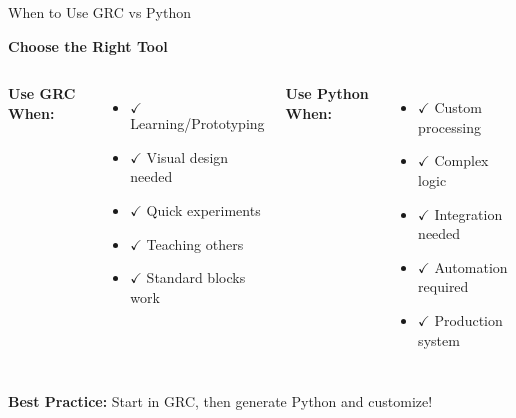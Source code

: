 \documentclass[aspectratio=169,11pt]{beamer}
\begin{document}
\begin{frame}{When to Use GRC vs Python}
\begin{center}
\Large\textbf{Choose the Right Tool}
\end{center}
\vspace{1em}
\begin{columns}
\textbf{Use GRC When:}
\begin{itemize}
    \item \textcolor{radiogreen}{$\checkmark$} Learning/Prototyping
    \item \textcolor{radiogreen}{$\checkmark$} Visual design needed
    \item \textcolor{radiogreen}{$\checkmark$} Quick experiments
    \item \textcolor{radiogreen}{$\checkmark$} Teaching others
    \item \textcolor{radiogreen}{$\checkmark$} Standard blocks work
\end{itemize}

\textbf{Use Python When:}
\begin{itemize}
    \item \textcolor{radioblue}{$\checkmark$} Custom processing
    \item \textcolor{radioblue}{$\checkmark$} Complex logic
    \item \textcolor{radioblue}{$\checkmark$} Integration needed
    \item \textcolor{radioblue}{$\checkmark$} Automation required
    \item \textcolor{radioblue}{$\checkmark$} Production system
\end{itemize}
\end{columns}
\vspace{1em}
\begin{center}\colorbox{yellow!20}{\parbox{0.9\textwidth}{
\textbf{Best Practice:} Start in GRC, then generate Python and customize!
}}\end{center}
\end{frame}
\end{document}
